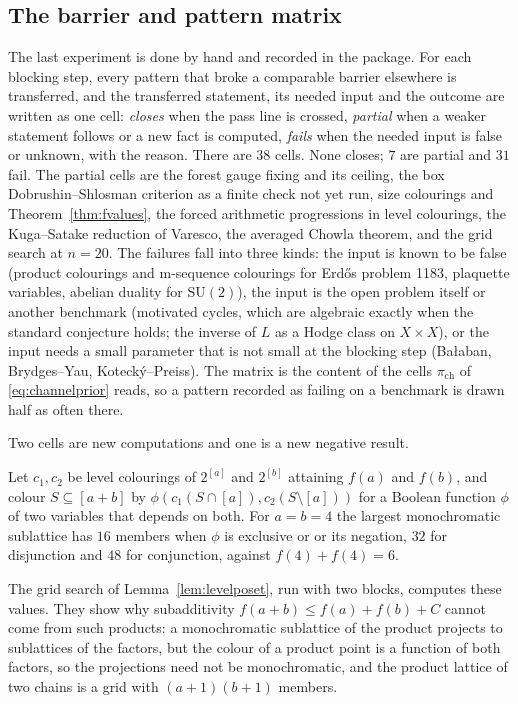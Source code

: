\subsection{The barrier and pattern matrix}\label{ssec:matrix}

The last experiment is done by hand and recorded in the package. For each blocking step, every pattern that broke a comparable barrier elsewhere is transferred, and the transferred statement, its needed input and the outcome are written as one cell: \emph{closes} when the pass line is crossed, \emph{partial} when a weaker statement follows or a new fact is computed, \emph{fails} when the needed input is false or unknown, with the reason. There are $38$ cells. None closes; $7$ are partial and $31$ fail. The partial cells are the forest gauge fixing and its ceiling, the box Dobrushin--Shlosman criterion as a finite check not yet run, size colourings and Theorem~\ref{thm:fvalues}, the forced arithmetic progressions in level colourings, the Kuga--Satake reduction of Varesco, the averaged Chowla theorem, and the grid search at $n=20$. The failures fall into three kinds: the input is known to be false (product colourings and m-sequence colourings for Erd\H{o}s problem 1183, plaquette variables, abelian duality for $\mathrm{SU}(2)$), the input is the open problem itself or another benchmark (motivated cycles, which are algebraic exactly when the standard conjecture holds; the inverse of $L$ as a Hodge class on $X\times X$), or the input needs a small parameter that is not small at the blocking step (Ba{\l}aban, Brydges--Yau, Kotecký--Preiss). The matrix is the content of the cells $\pi_{\mathrm{ch}}$ of \eqref{eq:channelprior} reads, so a pattern recorded as failing on a benchmark is drawn half as often there.

Two cells are new computations and one is a new negative result.

\begin{proposition}\label{prop:productrules}
Let $c_{1},c_{2}$ be level colourings of $2^{[a]}$ and $2^{[b]}$ attaining $f(a)$ and $f(b)$, and colour $S\subseteq[a+b]$ by $\phi(c_{1}(S\cap[a]),c_{2}(S\setminus[a]))$ for a Boolean function $\phi$ of two variables that depends on both. For $a=b=4$ the largest monochromatic sublattice has $16$ members when $\phi$ is exclusive or or its negation, $32$ for disjunction and $48$ for conjunction, against $f(4)+f(4)=6$.
\end{proposition}

The grid search of Lemma~\ref{lem:levelposet}, run with two blocks, computes these values. They show why subadditivity $f(a+b)\le f(a)+f(b)+C$ cannot come from such products: a monochromatic sublattice of the product projects to sublattices of the factors, but the colour of a product point is a function of both factors, so the projections need not be monochromatic, and the product lattice of two chains is a grid with $(a+1)(b+1)$ members.

